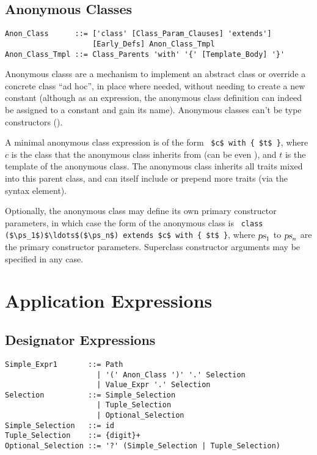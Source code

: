 \subsection{Anonymous Classes}
\label{sec:anonymous-classes}

\syntax\begin{lstlisting}
Anon_Class      ::= ['class' [Class_Param_Clauses] 'extends'] 
                    [Early_Defs] Anon_Class_Tmpl
Anon_Class_Tmpl ::= Class_Parents 'with' '{' [Template_Body] '}'
\end{lstlisting}

Anonymous classs are a mechanism to implement an abstract class or override a concrete class ``ad hoc'', in place where needed, without needing to create a new constant (although as an expression, the anonymous class definition can indeed be assigned to a constant and gain its name). Anonymous classes can't be type constructors (). 

A minimal anonymous class expression is of the form ~\lstinline!$c$ with { $t$ }!, where $c$ is the class that the anonymous class inherits from (can be even ), and $t$ is the template of the anonymous class. The anonymous class inherits all traits mixed into this parent class, and can itself include or prepend more traits (via the  syntax element). 

Optionally, the anonymous class may define its own primary constructor parameters, in which case the form of the anonymous class is ~\lstinline!class ($\ps_1$)$\ldots$($\ps_n$) extends $c$ with { $t$ }!, where $\mbox{\sl ps}_1$ to $\mbox{\sl ps}_n$ are the primary constructor parameters. Superclass constructor arguments may be specified in any case. 






\section{Application Expressions}







\subsection{Designator Expressions}
\label{sec:designators}

\syntax\begin{lstlisting}
Simple_Expr1       ::= Path
                     | '(' Anon_Class ')' '.' Selection
                     | Value_Expr '.' Selection
Selection          ::= Simple_Selection
                     | Tuple_Selection
                     | Optional_Selection
Simple_Selection   ::= id
Tuple_Selection    ::= {digit}+
Optional_Selection ::= '?' (Simple_Selection | Tuple_Selection)
\end{lstlisting}


